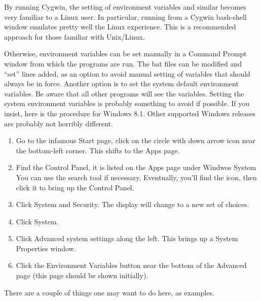 \begin{itemize}
By running Cygwin, the setting of environment variables and similar
becomes very familiar to a Linux user.  In particular, running {\Xic}
from a Cygwin bash-shell window emulates pretty well the Linux
experience.  This is a recommended approach for those familiar with
Unix/Linux.

Otherwise, environment variables can be set manually in a {\cb Command
Prompt} window from which the programs are run.  The {\vt bat} files
can be modified and ``{\vt set}'' lines added, as an option to avoid
manual setting of variables that should always be in force.  Another
option is to set the system default environment variables.  Be aware
that all other programs will see the variables.  Setting the system
environment variables is probably something to avoid if possible.  If
you insist, here is the procedure for Windows 8.1.  Other supported
Windows releases are probably not horribly different.

\begin{enumerate}
\item{Go to the infamous {\cb Start} page, click on the circle with
down arrow icon near the bottom-left corner.  This shifts to the {\cb
Apps} page.}

\item{Find the {\cb Control Panel}, it is listed on the {\cb Apps}
page under {\cb Windwos System} You can use the search tool if
necessary.  Eventually, you'll find the icon, then click it to bring
up the {\cb Control Panel}.}

\item{Click {\cb System and Security}.  The display will change to a
new set of choices.}

\item{Click {\cb System}.}

\item{Click {\cb Advanced system settings} along the left.  This
brings up a {\cb System Properties} window.}

\item{Click the {\cb Environment Variables} button near the bottom of
the {\cb Advanced} page (this page should be shown initially).}
\end{enumerate}

There are a couple of things one may want to do here, as examples.


\end{itemize}
